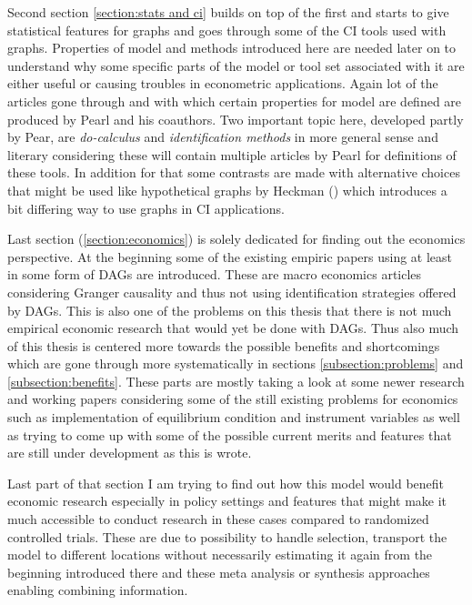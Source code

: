 \documentclass[main=english,12pt,a4paper,pdftex,econ,utf8]{aaltothesis}
\begin{document}
Second section \ref{section:stats and ci} builds on top of the first and starts to give statistical features for graphs and goes through some of the CI tools used with graphs. Properties of model and methods introduced here are needed later on to understand why some specific parts of the model or tool set associated with it are either useful or causing troubles in econometric applications. Again lot of the articles gone through and with which certain properties for model are defined are produced by Pearl and his coauthors. Two important topic here, developed partly by Pear, are \textit{do-calculus} and \textit{identification methods} in more general sense and literary considering these will contain multiple articles by Pearl for definitions of these tools. In addition for that some contrasts are made with alternative choices that might be used like hypothetical graphs by Heckman (\cite{Heckman2015}) which introduces a bit differing way to use graphs in CI applications.

Last section (\ref{section:economics}) is solely dedicated for finding out the economics perspective. At the beginning some of the existing empiric papers using at least in some form of DAGs are introduced. These are macro economics articles considering Granger causality and thus not using identification strategies offered by DAGs. This is also one of the problems on this thesis that there is not much empirical economic research that would yet be done with DAGs. Thus also much of this thesis is centered more towards the possible benefits and shortcomings which are gone through more systematically in sections \ref{subsection:problems} and \ref{subsection:benefits}. These parts are mostly taking a look at some newer research and working papers considering some of the still existing problems for economics such as implementation of equilibrium condition and instrument variables as well as trying to come up with some of the possible current merits and features that are still under development as this is wrote.

Last part of that section I am trying to find out how this model would benefit economic research especially in policy settings and features that might make it much accessible to conduct research in these cases compared to randomized controlled trials. These are due to possibility to handle selection, transport the model to different locations without necessarily estimating it again from the beginning introduced there and these meta analysis or synthesis approaches enabling combining information.
\end{document}
